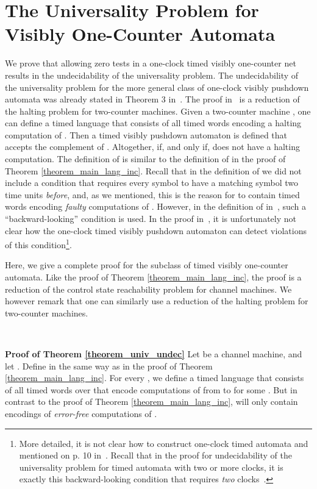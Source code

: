 \documentclass{CSML}
\theoremstyle{plain}\newtheorem{theorem}[thm]{Theorem}
\theoremstyle{plain}\newtheorem{corollary}[thm]{Corollary}
\theoremstyle{plain}\newtheorem{example}[thm]{Example}
\theoremstyle{plain}\newtheorem{lemma}[thm]{Lemma}
\theoremstyle{plain}\newtheorem{remark}[thm]{Remark}
\begin{document}
		\section{The Universality Problem for Visibly One-Counter Automata}
		We prove that allowing zero tests in a one-clock timed visibly one-counter net results in the undecidability of the universality problem.
		The undecidability of the universality problem for the more general class of one-clock visibly pushdown automata was already stated in Theorem 3 in~\cite{EmmiM06}.
		The proof in~\cite{EmmiM06} is a reduction of the halting problem for two-counter machines. 
		Given a two-counter machine , 
		one can define a timed language  that consists of all timed words encoding a halting computation of . 
		Then a timed visibly pushdown automaton  is defined that accepts the complement of . 
		Altogether,  if, and only if,  does not have a halting computation. 
		The definition of  is similar to the definition of  in the proof of Theorem \ref{theorem_main_lang_inc}. 
		Recall that in the definition of  we did not include a condition that requires every symbol to have a matching symbol two time units \emph{before}, and, as we mentioned, 
		this is the reason for  to contain timed words encoding \emph{faulty} computations of . 
		However, in the definition of  in~\cite{EmmiM06}, such a ``backward-looking'' condition is used. In the proof in~\cite{EmmiM06}, it is unfortunately not clear how the  one-clock timed visibly pushdown automaton  can detect violations of this condition\footnote{More detailed, it is not clear how to construct one-clock timed automata  and  mentioned on p. 10 in~\cite{EmmiM06}. Recall that in the proof for undecidability of the universality problem for timed automata with two or more clocks, it is exactly this backward-looking condition that requires \emph{two} clocks~\cite{DBLP:conf/formats/AdamsOW07}.}. 
		
		Here, we give a complete proof for the subclass of timed visibly one-counter automata. 
		Like the proof of Theorem \ref{theorem_main_lang_inc}, the proof is a reduction of the control state reachability problem for channel machines. 
		We however remark that one can similarly use a reduction of the halting problem for two-counter machines.  		
		
		\
	
		\noindent
		{\bf Proof of Theorem \ref{theorem_univ_undec}} 
		Let  be a channel machine, and let . 
		Define  in the same way as in the proof of Theorem \ref{theorem_main_lang_inc}.
		For every , we define a timed language 
		that 
		consists of all timed words over  that encode computations of  from  to  for some . But in contrast to the proof of Theorem \ref{theorem_main_lang_inc}, 
		 will only contain encodings of \emph{error-free} computations of . 
		
\end{document}
